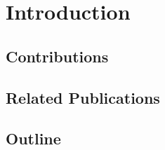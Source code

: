 \chapter{Introduction}\label{chap:introduction}
\lipsum[1]
\section{Contributions}\label{sec:introduction_contributions}
\lipsum[1]
\section{Related Publications}\label{sec:introduction_publications}
\lipsum[1]
\section{Outline}\label{sec:introduction_outline}
\lipsum[1]